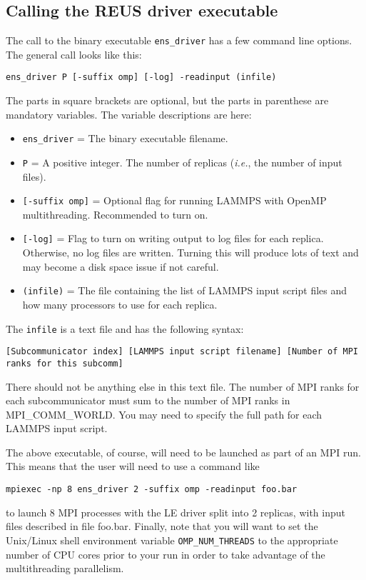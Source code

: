 \documentclass[10pt]{article}
\begin{document}
\subsection{Calling the REUS driver executable}\label{ssec:running_REUS}

The call to the binary executable \texttt{ens\_driver} has a few command line options.
The general call looks like this:
\begin{verbatim}
ens_driver P [-suffix omp] [-log] -readinput (infile)
\end{verbatim}
The parts in square brackets are optional, but the parts in parenthese are mandatory variables. 
The variable descriptions are here:
\begin{itemize}
\item	\texttt{ens\_driver} = The binary executable filename.
\item	\texttt{P} = A positive integer. 
		The number of replicas ({\em i.e.}, the number of input files).
\item	\texttt{[-suffix omp]} = Optional flag for running LAMMPS with OpenMP multithreading.
		Recommended to turn on.
\item	\texttt{[-log]} = Flag to turn on writing output to log files for each replica. Otherwise,
		no log files are written. Turning this will produce lots of text and may become a 
		disk space issue if not careful.
\item	\texttt{(infile)} = The file containing the list of LAMMPS input script files and how many
		processors to use for each replica.
\end{itemize}

The \texttt{infile} is a text file and has the following syntax:
\begin{verbatim}
[Subcommunicator index] [LAMMPS input script filename] [Number of MPI ranks for this subcomm]
\end{verbatim}
There should not be anything else in this text file. The number of MPI ranks
for each subcommunicator must sum to the number of MPI ranks in MPI\_COMM\_WORLD. You
may need to specify the full path for each LAMMPS input script.

The above executable, of course, will need to be launched as part of an MPI run. This means
that the user will need to use a command like
\begin{verbatim}
mpiexec -np 8 ens_driver 2 -suffix omp -readinput foo.bar
\end{verbatim}
to launch 8 MPI processes with the LE driver split into 2 replicas, 
with input files described in file foo.bar.
Finally, note that you will want to
set the Unix/Linux shell environment variable \texttt{OMP\_NUM\_THREADS} to the appropriate
number of CPU cores prior to your run in order to take advantage of the multithreading parallelism. 
\end{document}
